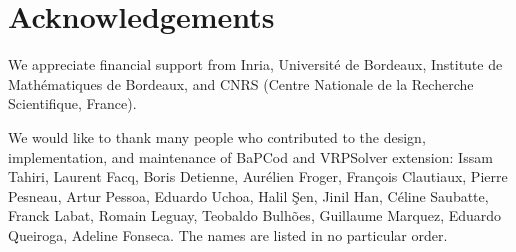 \documentclass[10pt,a4paper]{article}
\newcommand{\bc}{BaPCod\xspace}
\begin{document}
\section*{Acknowledgements}

We appreciate financial support from Inria, Universit\'{e} de Bordeaux, Institute de Math\'{e}matiques de Bordeaux, and
CNRS (Centre Nationale de la Recherche Scientifique, France).

We would like to thank many people who contributed to the design, implementation, and maintenance of \bc and VRPSolver
extension: Issam Tahiri, Laurent Facq, Boris Detienne, Aur\'{e}lien Froger, Fran\c{c}ois Clautiaux, Pierre Pesneau, Artur
Pessoa, Eduardo Uchoa, Halil \c{S}en, Jinil Han, C\'{e}line Saubatte, Franck Labat, Romain Leguay, Teobaldo Bulh\~{o}es,
Guillaume Marquez, Eduardo Queiroga, Adeline Fonseca. The names are listed in no particular order.

 
 
\end{document}
